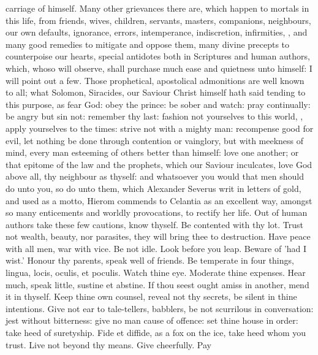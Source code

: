 {carriage of himself.
Many other grievances there are, which happen to mortals in this life,
from friends, wives, children, servants, masters, companions,
neighbours, our own defaults, ignorance, errors, intemperance,
indiscretion, infirmities, \etc{}, and many good remedies to mitigate and
oppose them, many divine precepts to counterpoise our hearts, special
antidotes both in Scriptures and human authors, which, whoso will
observe, shall purchase much ease and quietness unto himself: I will
point out a few. Those prophetical, apostolical admonitions are well
known to all; what Solomon, Siracides, our Saviour Christ himself hath
said tending to this purpose, as fear God: obey the prince: be sober
and watch: pray continually: be angry but sin not: remember thy last:
fashion not yourselves to this world, \etc{}, apply yourselves to the
times: strive not with a mighty man: recompense good for evil, let
nothing be done through contention or vainglory, but with meekness of
mind, every man esteeming of others better than himself: love one
another; or that epitome of the law and the prophets, which our Saviour
inculcates, love God above all, thy neighbour as thyself: and
whatsoever you would that men should do unto you, so do unto them,
which Alexander Severus writ in letters of gold, and used as a motto,
 Hierom commends to Celantia as an excellent way, amongst so many
enticements and worldly provocations, to rectify her life. Out of human
authors take these few cautions, know thyself. Be contented
with thy lot. Trust not wealth, beauty, nor parasites, they will
bring thee to destruction. Have peace with all men, war with
vice. Be not idle. Look before you leap. Beware of
'had I wist.' Honour thy parents, speak well of friends. Be
temperate in four things, lingua, locis, oculis, et poculis. Watch
thine eye. Moderate thine expenses. Hear much, speak little,
sustine et abstine. If thou seest ought amiss in another, mend it
in thyself. Keep thine own counsel, reveal not thy secrets, be silent
in thine intentions. Give not ear to tale-tellers, babblers, be
not scurrilous in conversation: jest without bitterness: give no
man cause of offence: set thine house in order: take heed of
suretyship. Fide et diffide, as a fox on the ice, take heed whom
you trust. Live not beyond thy means. Give cheerfully. Pay
}
